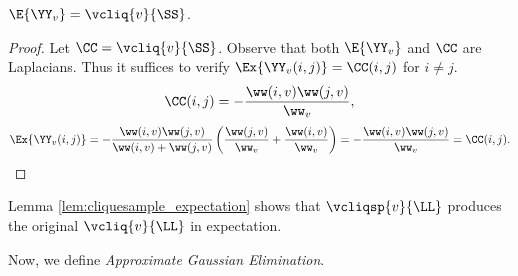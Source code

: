 \begin{lemma}\label{lem:cliquesample_expectation}
  $\E{\YY_v} = \vcliq{v}{\SS}$.
\end{lemma}
\begin{proof}
  Let $\CC=\vcliq{v}{\SS}$. Observe that both $\E{\YY_v}$ and $\CC$ are Laplacians. Thus it suffices to verify $\Ex{\YY_v(i,j)}=\CC(i,j)$ for $i\neq j$.
  \[ \CC(i,j) = -\frac{\ww(i,v)\ww(j,v)}{\ww_v}, \]
  \[ \Ex{\YY_v(i,j)} = -\frac{\ww(i,v)\ww(j,v)}{\ww(i,v)+\ww(j,v)} \left( \frac{\ww(j,v)}{\ww_v} + \frac{\ww(i,v)}{\ww_v} \right) = -\frac{\ww(i,v)\ww(j,v)}{\ww_v} = \CC(i,j). \]
\end{proof}
\begin{remark}
  Lemma \ref{lem:cliquesample_expectation} shows that $\vcliqsp{v}{\LL}$ produces the original $\vcliq{v}{\LL}$ in expectation.
\end{remark}

Now, we define \emph{Approximate Gaussian Elimination}.

